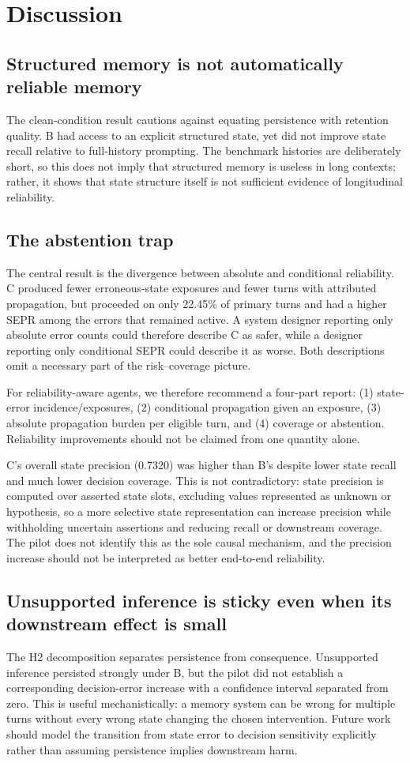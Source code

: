 \documentclass[10pt]{article}
\begin{document}
\section{Discussion}
\subsection{Structured memory is not automatically reliable memory}
The clean-condition result cautions against equating persistence with retention quality. B had access to an explicit structured state, yet did not improve state recall relative to full-history prompting. The benchmark histories are deliberately short, so this does not imply that structured memory is useless in long contexts; rather, it shows that state structure itself is not sufficient evidence of longitudinal reliability.

\subsection{The abstention trap}
The central result is the divergence between absolute and conditional reliability. C produced fewer erroneous-state exposures and fewer turns with attributed propagation, but proceeded on only 22.45\% of primary turns and had a higher SEPR among the errors that remained active. A system designer reporting only absolute error counts could therefore describe C as safer, while a designer reporting only conditional SEPR could describe it as worse. Both descriptions omit a necessary part of the risk--coverage picture.

For reliability-aware agents, we therefore recommend a four-part report: (1) state-error incidence/exposures, (2) conditional propagation given an exposure, (3) absolute propagation burden per eligible turn, and (4) coverage or abstention. Reliability improvements should not be claimed from one quantity alone.

C's overall state precision (0.7320) was higher than B's despite lower state recall and much lower decision coverage. This is not contradictory: state precision is computed over asserted state slots, excluding values represented as unknown or hypothesis, so a more selective state representation can increase precision while withholding uncertain assertions and reducing recall or downstream coverage. The pilot does not identify this as the sole causal mechanism, and the precision increase should not be interpreted as better end-to-end reliability.

\subsection{Unsupported inference is sticky even when its downstream effect is small}
The H2 decomposition separates persistence from consequence. Unsupported inference persisted strongly under B, but the pilot did not establish a corresponding decision-error increase with a confidence interval separated from zero. This is useful mechanistically: a memory system can be wrong for multiple turns without every wrong state changing the chosen intervention. Future work should model the transition from state error to decision sensitivity explicitly rather than assuming persistence implies downstream harm.
\end{document}
